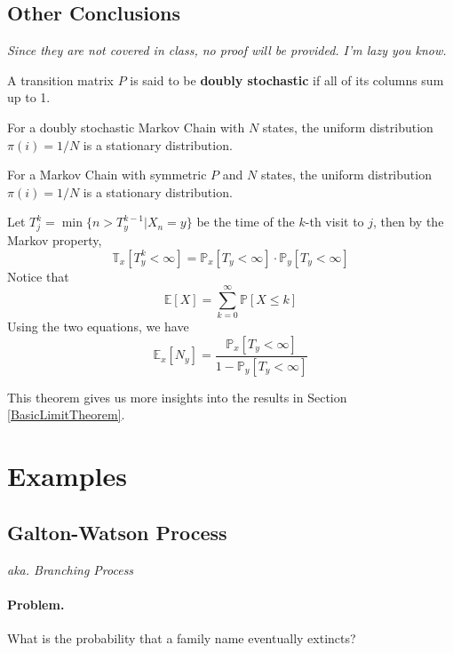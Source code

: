 \subsection{Other Conclusions}
\emph{Since they are not covered in class, no proof will be provided. I'm lazy you know.}
\begin{definition}
    A transition matrix $P$ is said to be \textbf{doubly stochastic} if all of its columns sum up to 1.
\end{definition}
\begin{optTheorem}
    For a doubly stochastic Markov Chain with $N$ states, the uniform distribution $\pi(i) = 1/N$ is a stationary distribution.
\end{optTheorem}
\begin{optTheorem}
    For a Markov Chain with symmetric $P$ and $N$ states, the uniform distribution $\pi(i) = 1/N$ is a stationary distribution.
\end{optTheorem}
\begin{optTheorem}
    Let $T_j^k = \min\{ n > T_y^{k-1} | X_n = y \}$ be the time of the $k$-th visit to $j$, then by the Markov property,
    \[ \mathbb{T}_x[T_y^k < \infty] = \mathbb{P}_x[T_y < \infty]\cdot\mathbb{P}_y[T_y<\infty] \]
    Notice that
    \[ \mathbb{E}[X] = \sum_{k=0}^{\infty}\mathbb{P}[X \le k] \]
    Using the two equations, we have
    \[ \mathbb{E}_x[N_y] = \frac{\mathbb{P}_x[T_y < \infty]}{1-\mathbb{P}_y[T_y < \infty]} \]
\end{optTheorem}
\begin{remark}
    This theorem gives us more insights into the results in Section \ref{BasicLimitTheorem}.
\end{remark}

\section{Examples}
\subsection{Galton-Watson Process}
\emph{aka. Branching Process}
\paragraph*{Problem.} What is the probability that a family name eventually extincts?
